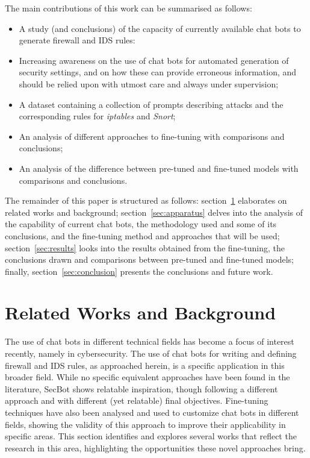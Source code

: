 \documentclass[sigconf]{acmart}
\begin{document}
The main contributions of this work can be summarised as follows:
\begin{itemize}
    \item A study (and conclusions) of the capacity of currently available chat bots to generate firewall and IDS rules:
    \item Increasing awareness on the use of chat bots for automated generation of security settings, and on how these can provide erroneous information, and should be relied upon with utmost care and always under supervision;
    \item A dataset containing a collection of prompts describing attacks and the corresponding rules for \textit{iptables} and \textit{Snort};
    \item An analysis of different approaches to fine-tuning with comparisons and conclusions;
    \item An analysis of the difference between pre-tuned and fine-tuned models with comparisons and conclusions.
\end{itemize}
The remainder of this paper is structured as follows: section~\ref{sec:related}
elaborates on related works and background; section~\ref{sec:apparatus} delves into
the analysis of the capability of current chat bots, the methodology used and some of its conclusions, and the fine-tuning method
and approaches that will be used; section~\ref{sec:results} looks into the results
obtained from the fine-tuning, the conclusions drawn and comparisons between pre-tuned and fine-tuned models; finally, section~\ref{sec:conclusion}
presents the conclusions and future work.

\section{Related Works and Background}\label{sec:related}
The use of chat bots in different technical fields has become a focus of interest recently, namely in cybersecurity. The use of chat bots for writing and defining firewall and IDS rules, as approached herein, is a specific application in this broader field. While no specific equivalent approaches have been found in the literature, SecBot \cite{Franco20, Shaqiri21} shows relatable inspiration, though following a different approach and with different (yet relatable) final objectives. Fine-tuning techniques have also been analysed and used to customize chat bots in different fields, showing the validity of this approach to improve their applicability in specific areas. This section identifies and explores several works that reflect the research in this area, highlighting the opportunities these novel approaches bring.
\end{document}
